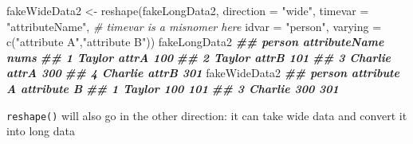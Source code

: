 \documentclass[
  12pt,
  krantz2]{krantz}
\makeatletter
\newenvironment{Shaded}{\begin{snugshade}}{\end{snugshade}}
\newcommand{\AttributeTok}[1]{\textcolor[rgb]{0.61,0.61,0.61}{#1}}
\newcommand{\CommentTok}[1]{\textcolor[rgb]{0.37,0.37,0.37}{\textit{#1}}}
\newcommand{\DocumentationTok}[1]{\textcolor[rgb]{0.37,0.37,0.37}{\textbf{\textit{#1}}}}
\newcommand{\FunctionTok}[1]{\textcolor[rgb]{0,0,0}{#1}}
\newcommand{\NormalTok}[1]{#1}
\newcommand{\OtherTok}[1]{\textcolor[rgb]{0.37,0.37,0.37}{#1}}
\newcommand{\StringTok}[1]{\textcolor[rgb]{0.5,0.5,0.5}{#1}}
\newenvironment{kframe}{%
\medskip{}
\setlength{\fboxsep}{.8em}
 \def\at@end@of@kframe{}%
 \ifinner\ifhmode%
  \def\at@end@of@kframe{\end{minipage}}%
  \begin{minipage}{\columnwidth}%
 \fi\fi%
 \def\FrameCommand##1{\hskip\@totalleftmargin \hskip-\fboxsep
 \colorbox{shadecolor}{##1}\hskip-\fboxsep
     \hskip-\linewidth \hskip-\@totalleftmargin \hskip\columnwidth}%
 \MakeFramed {\advance\hsize-\width
   \@totalleftmargin\z@ \linewidth\hsize
   \@setminipage}}%
 {\par\unskip\endMakeFramed%
 \at@end@of@kframe}
\renewenvironment{Shaded}{\begin{kframe}}{\end{kframe}}
\makeatother
\begin{document}
\begin{Shaded}
\begin{Highlighting}[]
\NormalTok{fakeWideData2 }\OtherTok{\textless{}{-}} \FunctionTok{reshape}\NormalTok{(fakeLongData2, }
                           \AttributeTok{direction =} \StringTok{"wide"}\NormalTok{, }
                           \AttributeTok{timevar =} \StringTok{"attributeName"}\NormalTok{, }\CommentTok{\# timevar is a misnomer here}
                           \AttributeTok{idvar =} \StringTok{"person"}\NormalTok{, }
                           \AttributeTok{varying =} \FunctionTok{c}\NormalTok{(}\StringTok{"attribute A"}\NormalTok{,}\StringTok{"attribute B"}\NormalTok{)) }
\NormalTok{fakeLongData2}
\DocumentationTok{\#\#    person attributeName nums}
\DocumentationTok{\#\# 1  Taylor         attrA  100}
\DocumentationTok{\#\# 2  Taylor         attrB  101}
\DocumentationTok{\#\# 3 Charlie         attrA  300}
\DocumentationTok{\#\# 4 Charlie         attrB  301}
\NormalTok{fakeWideData2}
\DocumentationTok{\#\#    person attribute A attribute B}
\DocumentationTok{\#\# 1  Taylor         100         101}
\DocumentationTok{\#\# 3 Charlie         300         301}
\end{Highlighting}
\end{Shaded}

\texttt{reshape()} will also go in the other direction: it can take wide data and convert it into long data
\end{document}
